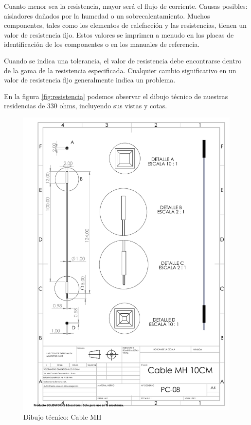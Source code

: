     Cuanto menor sea la resistencia, mayor será el flujo de corriente. Causas posibles: aisladores dañados por la humedad o un sobrecalentamiento.
    Muchos componentes, tales como los elementos de calefacción y las resistencias, tienen un valor de resistencia fijo. Estos valores se imprimen a menudo en las placas de identificación de los componentes o en los manuales de referencia.
    
    Cuando se indica una tolerancia, el valor de resistencia debe encontrarse dentro de la gama de la resistencia especificada. Cualquier cambio significativo en un valor de resistencia fijo generalmente indica un problema. \cite{Fluke}
    
    
     En la figura \ref{fig:resistencia} podemos observar el dibujo técnico de nuestras residencias de 330 ohms, incluyendo sus vistas y cotas.
     \begin{figure}[H]
        \centering
        \includegraphics[trim = {21mm 70mm 140mm 17mm},clip,scale=0.4, angle=270]{22/Img/cableMHDibujo.PDF}
        \caption{Dibujo técnico: Cable MH}
        \label{fig:Cable MH}
    \end{figure}
    
